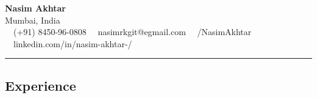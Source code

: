 \documentclass[11pt,letterpaper]{article}
\begin{document}
\begin{center}
{\LARGE \textbf{Nasim Akhtar}}\\
Mumbai, India
\vspace{0.05cm}
\\
\raisebox{-0.2\height} {\Large \faPhoneSquare} \ \  (+91) 8450-96-0808 \hfill\raisebox{-0.2\height}{\Large \faEnvelopeSquare} \ \ nasimrkgit@egmail.com \hfill \raisebox{-0.2\height}{\Large \faGithubSquare} \ \ /NasimAkhtar \hfill \raisebox{-0.2\height}{\Large \faLinkedinSquare} \ \ linkedin.com/in/nasim-akhtar-/
\end{center}

\hrule
\vspace{-1em}
\subsection*{\Large Experience}
\end{document}
